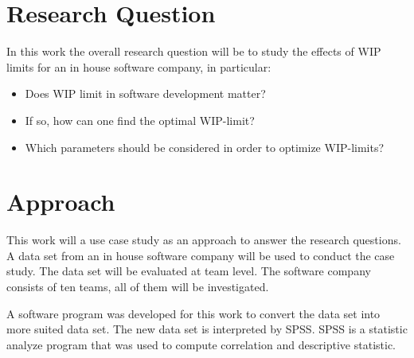 \documentclass[UKenglish]{ifimaster}  %
\begin{document}
\section{Research Question}
\label{chap:RQ}
In this work the overall research question will be to study the effects of WIP limits for an in house software company, in particular:
\begin{itemize}
\item Does WIP limit in software development matter?
\item If so, how can one find the optimal WIP-limit?
\item Which parameters should be considered in order to optimize WIP-limits? 
\end{itemize}


\section{Approach}
This work will a use case study as an approach  to answer the research questions.  A data set from an in house software company will be used to conduct the case study.  The data set will be evaluated at team level. The software company consists of ten teams, all of them will be investigated.

A software program was developed for this work to convert the data set into more suited data set. The new data set is interpreted by SPSS. SPSS is a statistic analyze program that was used to compute correlation and descriptive statistic. 
\end{document}

